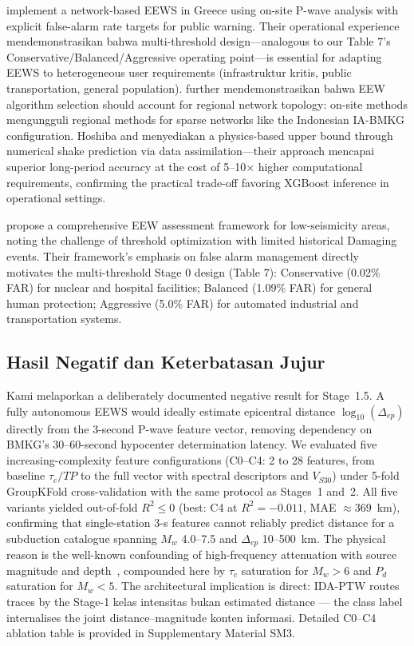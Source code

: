 \documentclass[10pt]{article}
\renewcommand{\cite}[1]{\citep{#1}}
\begin{document}
\citet{ref83} implement a network-based EEWS in Greece using on-site P-wave analysis with explicit false-alarm rate targets for public warning. Their operational experience mendemonstrasikan bahwa multi-threshold design---analogous to our Table 7's Conservative/Balanced/Aggressive operating point---is essential for adapting EEWS to heterogeneous user requirements (infrastruktur kritis, public transportation, general population). \citet{ref82} further mendemonstrasikan bahwa EEW algorithm selection should account for regional network topology: on-site methods mengungguli regional methods for sparse networks like the Indonesian IA-BMKG configuration. Hoshiba and \citet{ref84} menyediakan a physics-based upper bound through numerical shake prediction via data assimilation---their approach mencapai superior long-period accuracy at the cost of 5--10× higher computational requirements, confirming the practical trade-off favoring XGBoost inference in operational settings.

\citet{ref60} propose a comprehensive EEW assessment framework for low-seismicity areas, noting the challenge of threshold optimization with limited historical Damaging events. Their framework's emphasis on false alarm management directly motivates the multi-threshold Stage 0 design (Table 7): Conservative (0.02\% FAR) for nuclear and hospital facilities; Balanced (1.09\% FAR) for general human protection; Aggressive (5.0\% FAR) for automated industrial and transportation systems.


\subsection{Hasil Negatif dan Keterbatasan Jujur}

Kami melaporkan a deliberately documented negative result for Stage~1.5. A fully autonomous EEWS would ideally estimate epicentral distance $\log_{10}(\Delta_{ep})$ directly from the 3-second P-wave feature vector, removing dependency on BMKG's 30--60-second hypocenter determination latency. We evaluated five increasing-complexity feature configurations (C0--C4: 2 to 28 features, from baseline $\tau_c/TP$ to the full vector with spectral descriptors and $V_{S30}$) under 5-fold GroupKFold cross-validation with the same protocol as Stages~1 and~2. All five variants yielded out-of-fold $R^2 \leq 0$ (best: C4 at $R^2 = -0.011$, MAE $\approx 369$~km), confirming that single-station 3-s features cannot reliably predict distance for a subduction catalogue spanning $M_w$ 4.0--7.5 and $\Delta_{ep}$ 10--500~km. The physical reason is the well-known confounding of high-frequency attenuation with source magnitude and depth~\cite{ref22}, compounded here by $\tau_c$ saturation for $M_w > 6$ and $P_d$ saturation for $M_w < 5$. The architectural implication is direct: IDA-PTW routes traces by the Stage-1 kelas intensitas bukan estimated distance --- the class label internalises the joint distance--magnitude konten informasi. Detailed C0--C4 ablation table is provided in Supplementary Material SM3.
\end{document}
